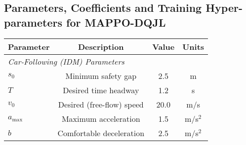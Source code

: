 \subsection{Parameters, Coefficients and Training Hyper-parameters for MAPPO-DQJL}
\begin{table}[htbp]
\centering
\scriptsize
\begin{tabular}{lccc}
\toprule
\textbf{Parameter} & \textbf{Description} & \textbf{Value} & \textbf{Units}\\
\midrule
\multicolumn{4}{l}{\textit{Car-Following (IDM) Parameters}} \\[6pt]
$s_0$        & Minimum safety gap                         & 2.5        & m \\
$T$          & Desired time headway                       & 1.2        & s \\
$v_0$        & Desired (free-flow) speed                  & 20.0       & m/s \\
$a_{\text{max}}$ & Maximum acceleration                     & 1.5        & m/s$^2$ \\
$b$          & Comfortable deceleration                   & 2.5        & m/s$^2$ \\[6pt]


\end{tabular}
\end{table}
